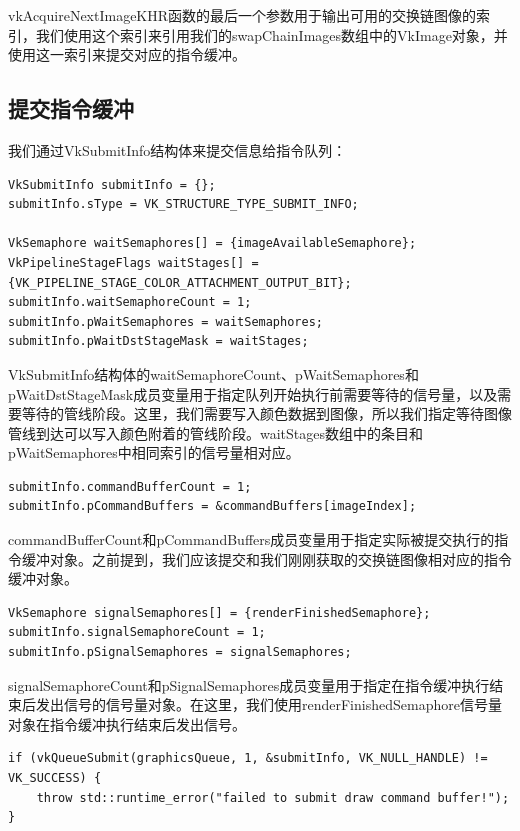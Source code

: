 \documentclass{ctexart}
\begin{document}
vkAcquireNextImageKHR函数的最后一个参数用于输出可用的交换链图像的索引，我们使用这个索引来引用我们的swapChainImages数组中的VkImage对象，并使用这一索引来提交对应的指令缓冲。

\subsection{提交指令缓冲}

我们通过VkSubmitInfo结构体来提交信息给指令队列：

\begin{lstlisting}[language={[ANSI]C}]
VkSubmitInfo submitInfo = {};
submitInfo.sType = VK_STRUCTURE_TYPE_SUBMIT_INFO;

VkSemaphore waitSemaphores[] = {imageAvailableSemaphore};
VkPipelineStageFlags waitStages[] = {VK_PIPELINE_STAGE_COLOR_ATTACHMENT_OUTPUT_BIT};
submitInfo.waitSemaphoreCount = 1;
submitInfo.pWaitSemaphores = waitSemaphores;
submitInfo.pWaitDstStageMask = waitStages;
\end{lstlisting}

VkSubmitInfo结构体的waitSemaphoreCount、pWaitSemaphores和pWaitDstStageMask成员变量用于指定队列开始执行前需要等待的信号量，以及需要等待的管线阶段。这里，我们需要写入颜色数据到图像，所以我们指定等待图像管线到达可以写入颜色附着的管线阶段。waitStages数组中的条目和pWaitSemaphores中相同索引的信号量相对应。

\begin{lstlisting}[language={[ANSI]C}]
submitInfo.commandBufferCount = 1;
submitInfo.pCommandBuffers = &commandBuffers[imageIndex];
\end{lstlisting}

commandBufferCount和pCommandBuffers成员变量用于指定实际被提交执行的指令缓冲对象。之前提到，我们应该提交和我们刚刚获取的交换链图像相对应的指令缓冲对象。

\begin{lstlisting}[language={[ANSI]C}]
VkSemaphore signalSemaphores[] = {renderFinishedSemaphore};
submitInfo.signalSemaphoreCount = 1;
submitInfo.pSignalSemaphores = signalSemaphores;
\end{lstlisting}

signalSemaphoreCount和pSignalSemaphores成员变量用于指定在指令缓冲执行结束后发出信号的信号量对象。在这里，我们使用renderFinishedSemaphore信号量对象在指令缓冲执行结束后发出信号。

\begin{lstlisting}[language={[ANSI]C}]
if (vkQueueSubmit(graphicsQueue, 1, &submitInfo, VK_NULL_HANDLE) != VK_SUCCESS) {
	throw std::runtime_error("failed to submit draw command buffer!");
}
\end{lstlisting}
\end{document}
